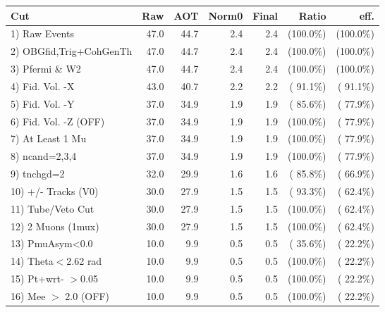  \begin{table}[h!]\centering
 \begin{tabular}{||l||r|r|r|r|r|r||}
 \hline
 \hline
 Cut & Raw & AOT & Norm0 & Final & Ratio & eff.       \\
 \hline
  1) Raw Events           &         47.0 &         44.7 &          2.4 &          2.4 & (100.0\%) & (100.0\%) \\
  2) OBGfid,Trig+CohGenTh &         47.0 &         44.7 &          2.4 &          2.4 & (100.0\%) & (100.0\%) \\
  3) Pfermi \& W2         &         47.0 &         44.7 &          2.4 &          2.4 & (100.0\%) & (100.0\%) \\
  4) Fid. Vol. -X         &         43.0 &         40.7 &          2.2 &          2.2 & ( 91.1\%) & ( 91.1\%) \\
  5) Fid. Vol. -Y         &         37.0 &         34.9 &          1.9 &          1.9 & ( 85.6\%) & ( 77.9\%) \\
  6) Fid. Vol. -Z (OFF)   &         37.0 &         34.9 &          1.9 &          1.9 & (100.0\%) & ( 77.9\%) \\
  7) At Least 1 Mu        &         37.0 &         34.9 &          1.9 &          1.9 & (100.0\%) & ( 77.9\%) \\
  8) ncand=2,3,4          &         37.0 &         34.9 &          1.9 &          1.9 & (100.0\%) & ( 77.9\%) \\
  9) tnchgd=2             &         32.0 &         29.9 &          1.6 &          1.6 & ( 85.8\%) & ( 66.9\%) \\
 10) +/- Tracks (V0)      &         30.0 &         27.9 &          1.5 &          1.5 & ( 93.3\%) & ( 62.4\%) \\
 11) Tube/Veto Cut        &         30.0 &         27.9 &          1.5 &          1.5 & (100.0\%) & ( 62.4\%) \\
 12) 2 Muons (1mux)       &         30.0 &         27.9 &          1.5 &          1.5 & (100.0\%) & ( 62.4\%) \\
 13) PmuAsym<0.0          &         10.0 &          9.9 &          0.5 &          0.5 & ( 35.6\%) & ( 22.2\%) \\
 14) Theta$<$2.62 rad     &         10.0 &          9.9 &          0.5 &          0.5 & (100.0\%) & ( 22.2\%) \\
 15) Pt+wrt- $>$0.05      &         10.0 &          9.9 &          0.5 &          0.5 & (100.0\%) & ( 22.2\%) \\
 16) Mee $>$ 2.0  (OFF)   &         10.0 &          9.9 &          0.5 &          0.5 & (100.0\%) & ( 22.2\%) \\

\end{tabular}
\end{table}
